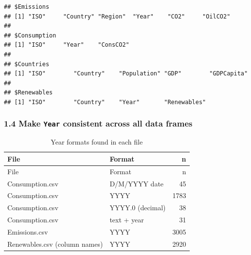 \documentclass[
]{article}
\newenvironment{Shaded}{\begin{snugshade}}{\end{snugshade}}
\newcommand{\AttributeTok}[1]{\textcolor[rgb]{0.13,0.29,0.53}{#1}}
\newcommand{\CommentTok}[1]{\textcolor[rgb]{0.56,0.35,0.01}{\textit{#1}}}
\newcommand{\FunctionTok}[1]{\textcolor[rgb]{0.13,0.29,0.53}{\textbf{#1}}}
\newcommand{\NormalTok}[1]{#1}
\newcommand{\OtherTok}[1]{\textcolor[rgb]{0.56,0.35,0.01}{#1}}
\newcommand{\SpecialCharTok}[1]{\textcolor[rgb]{0.81,0.36,0.00}{\textbf{#1}}}
\newcommand{\StringTok}[1]{\textcolor[rgb]{0.31,0.60,0.02}{#1}}
\begin{document}
\begin{verbatim}
## $Emissions
## [1] "ISO"     "Country" "Region"  "Year"    "CO2"     "OilCO2" 
## 
## $Consumption
## [1] "ISO"     "Year"    "ConsCO2"
## 
## $Countries
## [1] "ISO"        "Country"    "Population" "GDP"        "GDPCapita" 
## 
## $Renewables
## [1] "ISO"        "Country"    "Year"       "Renewables"
\end{verbatim}

\subsubsection{\texorpdfstring{1.4 Make \texttt{Year} consistent across
all data
frames}{1.4 Make Year consistent across all data frames}}\label{make-year-consistent-across-all-data-frames}

\begin{Shaded}
\end{Shaded}

\begin{longtable}[]{@{}llr@{}}
\caption{Year formats found in each file}\tabularnewline
\toprule\noalign{}
File & Format & n \\
\midrule\noalign{}
\endfirsthead
\toprule\noalign{}
File & Format & n \\
\midrule\noalign{}
\endhead
\bottomrule\noalign{}
\endlastfoot
Consumption.csv & D/M/YYYY date & 45 \\
Consumption.csv & YYYY & 1783 \\
Consumption.csv & YYYY.0 (decimal) & 38 \\
Consumption.csv & text + year & 31 \\
Emissions.csv & YYYY & 3005 \\
Renewables.csv (column names) & YYYY & 2920 \\
\end{longtable}
\end{document}
